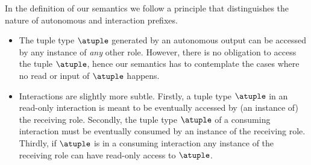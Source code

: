 In the definition of our semantics we follow a principle that
distinguishes the nature of autonomous and interaction prefixes.
\begin{itemize}
\item The tuple type $\atuple$ generated by an autonomous output can
  be accessed by any instance of \emph{any} other role.
  However, there is no obligation to access the tuple $\atuple$, hence
  our semantics has to contemplate the cases where no read or input of
  $\atuple$ happens.
\item Interactions are slightly more subtle.
  Firstly, a tuple type $\atuple$ in an read-only interaction is meant
  to be eventually accessed by (an instance of) the receiving role.
  Secondly, the tuple type $\atuple$ of a consuming interaction must
  be eventually consumed by an instance of the receiving role.
  Thirdly, if $\atuple$ is in a consuming interaction any instance of
  the receiving role can have read-only access to $\atuple$.
\end{itemize}

